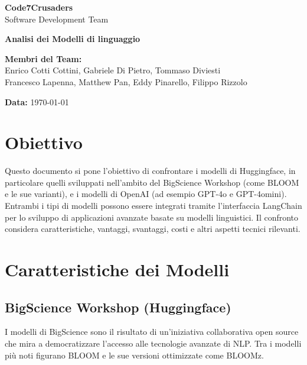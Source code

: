 \documentclass{article}
\begin{document}
\begin{titlepage}
    {\Huge \textbf{Code7Crusaders}}\\
    \vspace{0.5cm}
    {\Large Software Development Team}\\
    \vspace{2cm}
    
    {\large \textbf{Analisi dei Modelli di linguaggio}}\\
    \vspace{5cm}

    \textbf{Membri del Team:}\\
    Enrico Cotti Cottini, Gabriele Di Pietro, Tommaso Diviesti \\
    Francesco Lapenna, Matthew Pan, Eddy Pinarello, Filippo Rizzolo \\
    \vspace{0.5cm}
    
    {\large \textbf{Data:}} \today\\
    
    \vspace{1cm}
\end{titlepage}

\newpage
\tableofcontents
\newpage

\newpage
\listoffigures
\newpage

\section{Obiettivo}
Questo documento si pone l'obiettivo di confrontare i modelli di Huggingface, in particolare quelli sviluppati nell'ambito del BigScience Workshop (come BLOOM e le sue varianti), e i modelli di OpenAI (ad esempio GPT-4o e GPT-4omini). Entrambi i tipi di modelli possono essere integrati tramite l'interfaccia LangChain per lo sviluppo di applicazioni avanzate basate su modelli linguistici. Il confronto considera caratteristiche, vantaggi, svantaggi, costi e altri aspetti tecnici rilevanti.

\section{Caratteristiche dei Modelli}

\subsection{BigScience Workshop (Huggingface)}
I modelli di BigScience sono il risultato di un'iniziativa collaborativa open source che mira a democratizzare l'accesso alle tecnologie avanzate di NLP. Tra i modelli più noti figurano BLOOM e le sue versioni ottimizzate come BLOOMz.
\end{document}
